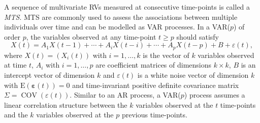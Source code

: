 A sequence of multivariate \acp{RV} measured at consecutive time-points is called a \textit{\ac{MTS}}. \ac{MTS} are commonly used to assess the associations between multiple individuals over time and can be modelled as \ac{VAR} processes. In a \ac{VAR}($p$) of order $p$, the variables observed at any time-point $t \geqslant p$ should satisfy
\begin{equation}
X(t)=A_{1} X(t-1)+\cdots+A_{i} X(t-i)+\cdots+A_{p} X(t-p)+B+\varepsilon(t),
\label{eq:multivariate_ts}
\end{equation}
where $X(t)=\left(X_{i}(t)\right)$ with $i=1,\ldots,k$ is the vector of $k$ variables observed at time $t$, $A_{i}$ with $i=1,\ldots,p$ are coefficient matrices of dimensions $k \times k$, $B$ is an intercept vector of dimension $k$ and $\varepsilon(t)$ is a white noise vector of dimension $k$ with $\mathrm{E}(\boldsymbol{\varepsilon}(t))=0$ and time-invariant positive definite covariance matrix $\Sigma = \operatorname{COV}(\varepsilon(t))$.
Similar to an \ac{AR} process, a \ac{VAR}($p$) process assumes a linear correlation structure between the $k$ variables observed at the $t$ time-points and the $k$ variables observed at the $p$ previous time-points.







